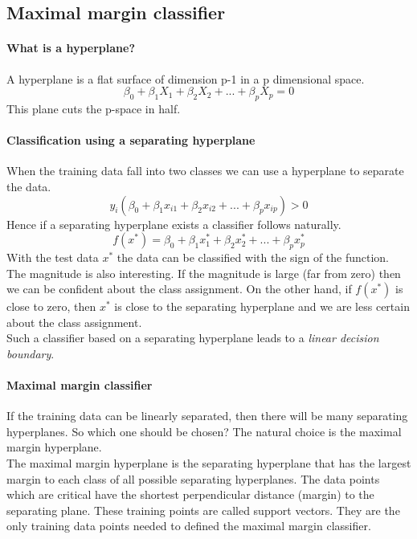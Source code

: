 \documentclass[../document.tex]{subfiles}
\begin{document}
	\subsection{Maximal margin classifier}

	\paragraph{What is a hyperplane?}
	A hyperplane is a flat surface of dimension p-1 in a p dimensional space.
	\begin{equation}
		\beta_{0}+\beta_{1}X_{1}+\beta_{2}X_{2}+...+\beta_{p}X_{p}=0
	\end{equation}
	This plane cuts the p-space in half.

	\paragraph{Classification using a separating hyperplane}
	When the training data fall into two classes we can use a hyperplane to separate the data.
	\begin{equation}
		y_{i}(\beta_{0}+\beta_{1}x_{i1}+\beta_{2}x_{i2}+...+\beta_{p}x_{ip}) > 0
	\end{equation}
	Hence if a separating hyperplane exists a classifier follows naturally.
	\begin{equation}
		f(x^*)=\beta_{0}+\beta_{1}x_{1}^*+\beta_{2}x_{2}^*+...+\beta_{p}x_{p}^*
	\end{equation}
	With the test data $x^*$ the data can be classified with the sign of the function. The magnitude is also interesting. If the magnitude is large (far from zero) then we can be confident about the class assignment. On the other hand, if $f(x^*)$ is close to zero, then $x^*$ is close to the separating hyperplane and we are less certain about the class assignment.\\
	Such a classifier based on a separating hyperplane leads to a \emph{linear decision boundary}.

	\paragraph{Maximal margin classifier}
	If the training data can be linearly separated, then there will be many separating hyperplanes. So which one should be chosen? The natural choice is the maximal margin hyperplane.\\
	The maximal margin hyperplane is the separating hyperplane that has the largest margin to each class of all possible separating hyperplanes. The data points which are critical have the shortest perpendicular distance (margin) to the separating plane. These training points are called support vectors. They are the only training data points needed to defined the maximal margin classifier.
\end{document}
